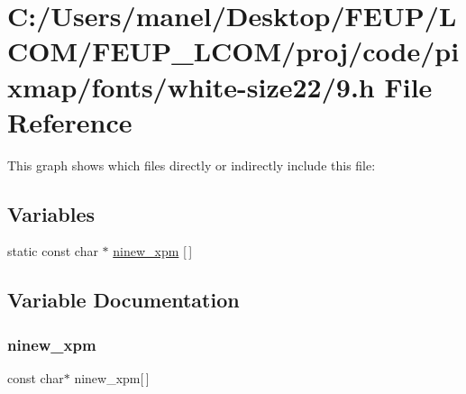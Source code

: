 \hypertarget{white-size22_29_8h}{}\section{C\+:/\+Users/manel/\+Desktop/\+F\+E\+U\+P/\+L\+C\+O\+M/\+F\+E\+U\+P\+\_\+\+L\+C\+O\+M/proj/code/pixmap/fonts/white-\/size22/9.h File Reference}
\label{white-size22_29_8h}
This graph shows which files directly or indirectly include this file\+:
\subsection*{Variables}
\begin{DoxyCompactItemize}
\item 
static const char $\ast$ \mbox{\hyperlink{white-size22_29_8h_a5974886943bb40e4cc9f2a3e73f24c9b}{ninew\+\_\+xpm}} \mbox{[}$\,$\mbox{]}
\end{DoxyCompactItemize}


\subsection{Variable Documentation}
\mbox{\label{white-size22_29_8h_a5974886943bb40e4cc9f2a3e73f24c9b}} 
\subsubsection{\texorpdfstring{ninew\_xpm}{ninew\_xpm}}
{\footnotesize\ttfamily const char$\ast$ ninew\+\_\+xpm\mbox{[}$\,$\mbox{]}\hspace{0.3cm}{\ttfamily [static]}}


